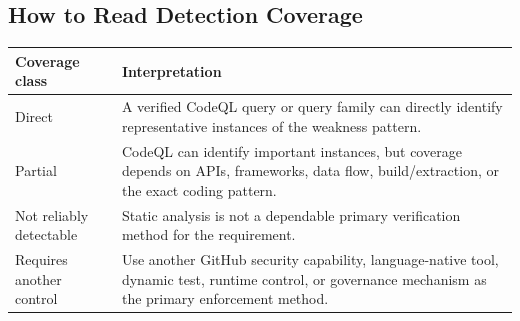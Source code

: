 \documentclass[10pt,letterpaper]{article}
\begin{document}
\subsection{How to Read Detection Coverage}
\begin{tabularx}{\textwidth}{@{}P{1.7in}Y@{}}
\toprule
\textbf{Coverage class} & \textbf{Interpretation}\\
\midrule
Direct & A verified CodeQL query or query family can directly identify representative instances of the weakness pattern.\\
Partial & CodeQL can identify important instances, but coverage depends on APIs, frameworks, data flow, build/extraction, or the exact coding pattern.\\
Not reliably detectable & Static analysis is not a dependable primary verification method for the requirement.\\
Requires another control & Use another GitHub security capability, language-native tool, dynamic test, runtime control, or governance mechanism as the primary enforcement method.\\
\bottomrule
\end{tabularx}
\clearpage
\end{document}
